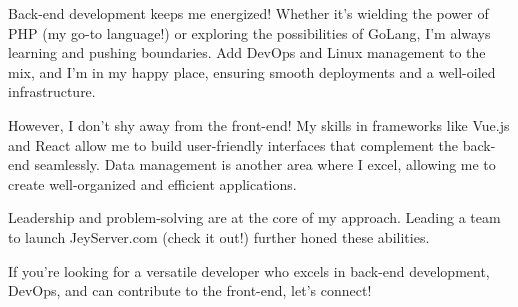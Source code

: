 
\begin{cvparagraph}

Back-end development keeps me energized! Whether it’s wielding the power of PHP (my go-to language!) or exploring the possibilities of GoLang, I’m always learning and pushing boundaries. Add DevOps and Linux management to the mix, and I’m in my happy place, ensuring smooth deployments and a well-oiled infrastructure.

However, I don’t shy away from the front-end! My skills in frameworks like Vue.js and React allow me to build user-friendly interfaces that complement the back-end seamlessly. Data management is another area where I excel, allowing me to create well-organized and efficient applications.

Leadership and problem-solving are at the core of my approach. Leading a team to launch JeyServer.com (check it out!) further honed these abilities.

If you’re looking for a versatile developer who excels in back-end development, DevOps, and can contribute to the front-end, let’s connect!
\end{cvparagraph}

